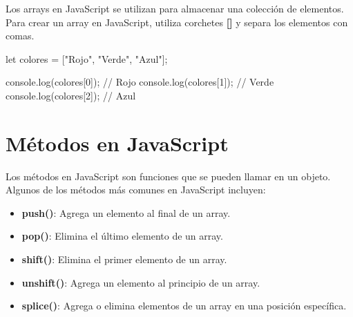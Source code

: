 \documentclass[
  a4paper,
  DIV=11,
  numbers=noendperiod,
  onepage,
  openany]{scrreprt}
\newenvironment{Shaded}{\begin{snugshade}}{\end{snugshade}}
\newcommand{\BuiltInTok}[1]{\textcolor[rgb]{0.00,0.23,0.31}{#1}}
\newcommand{\CommentTok}[1]{\textcolor[rgb]{0.37,0.37,0.37}{#1}}
\newcommand{\DecValTok}[1]{\textcolor[rgb]{0.68,0.00,0.00}{#1}}
\newcommand{\FunctionTok}[1]{\textcolor[rgb]{0.28,0.35,0.67}{#1}}
\newcommand{\KeywordTok}[1]{\textcolor[rgb]{0.00,0.23,0.31}{#1}}
\newcommand{\NormalTok}[1]{\textcolor[rgb]{0.00,0.23,0.31}{#1}}
\newcommand{\OperatorTok}[1]{\textcolor[rgb]{0.37,0.37,0.37}{#1}}
\newcommand{\StringTok}[1]{\textcolor[rgb]{0.13,0.47,0.30}{#1}}
\providecommand{\tightlist}{%
  \setlength{\itemsep}{0pt}\setlength{\parskip}{0pt}}\usepackage{longtable,booktabs,array}
\begin{document}
Los arrays en JavaScript se utilizan para almacenar una colección de
elementos. Para crear un array en JavaScript, utiliza corchetes
\textbf{{[}{]}} y separa los elementos con comas.

\begin{Shaded}
\begin{Highlighting}[]
\KeywordTok{let}\NormalTok{ colores }\OperatorTok{=}\NormalTok{ [}\StringTok{"Rojo"}\OperatorTok{,} \StringTok{"Verde"}\OperatorTok{,} \StringTok{"Azul"}\NormalTok{]}\OperatorTok{;}

\BuiltInTok{console}\OperatorTok{.}\FunctionTok{log}\NormalTok{(colores[}\DecValTok{0}\NormalTok{])}\OperatorTok{;} \CommentTok{// Rojo}
\BuiltInTok{console}\OperatorTok{.}\FunctionTok{log}\NormalTok{(colores[}\DecValTok{1}\NormalTok{])}\OperatorTok{;} \CommentTok{// Verde}
\BuiltInTok{console}\OperatorTok{.}\FunctionTok{log}\NormalTok{(colores[}\DecValTok{2}\NormalTok{])}\OperatorTok{;} \CommentTok{// Azul}
\end{Highlighting}
\end{Shaded}

\section{Métodos en JavaScript}\label{muxe9todos-en-javascript}

Los métodos en JavaScript son funciones que se pueden llamar en un
objeto. Algunos de los métodos más comunes en JavaScript incluyen:

\begin{itemize}
\tightlist
\item
  \textbf{push()}: Agrega un elemento al final de un array.
\item
  \textbf{pop()}: Elimina el último elemento de un array.
\item
  \textbf{shift()}: Elimina el primer elemento de un array.
\item
  \textbf{unshift()}: Agrega un elemento al principio de un array.
\item
  \textbf{splice()}: Agrega o elimina elementos de un array en una
  posición específica.
\end{itemize}
\end{document}
